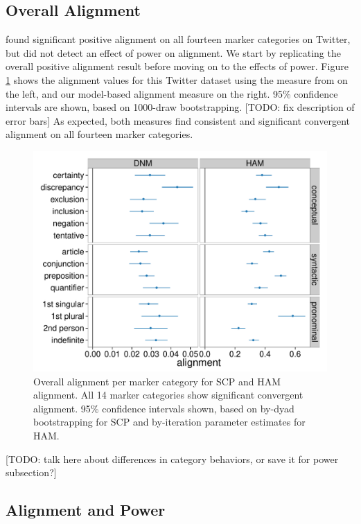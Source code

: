 \documentclass{acm_proc_article-sp}
\begin{document}
\subsection{Overall Alignment}

\cite{DNMGamonDumais2011} found significant positive alignment on all fourteen marker categories on Twitter, but did not detect an effect of power on alignment.  We start by replicating the overall positive alignment result before moving on to the effects of power.  Figure \ref{fig:overall-alignment} shows the alignment values for this Twitter dataset using the measure from \cite{DNMGamonDumais2011} on the left, and our model-based alignment measure on the right.  95\% confidence intervals are shown, based on 1000-draw bootstrapping. [TODO: fix description of error bars] As expected, both measures find consistent and significant convergent alignment on all fourteen marker categories.  

\begin{figure}[t]
\centering
\includegraphics[width=.9\columnwidth]{graphics/www2016_alignmentdnmour_final95.pdf}
\caption{Overall alignment per marker category for SCP and HAM alignment. All 14 marker categories show significant convergent alignment. 95\% confidence intervals shown, based on by-dyad bootstrapping for SCP and by-iteration parameter estimates for HAM.}\label{fig:overall-alignment}
\end{figure}

[TODO: talk here about differences in category behaviors, or save it for power subsection?]

\subsection{Alignment and Power}
\end{document}
